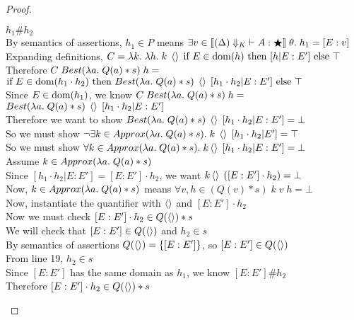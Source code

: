 \begin{proof}
\begin{tabbedproof}
            $h_1 \# h_2$ \\
    \oooooo By semantics of assertions, $h_1 \in P$ means 
            $\exists v \in \interp{\judgeWK[\restrictkind{\Delta}]{A}{\bigstar}}\;\theta.\;
               h_1 = [E:v]$ \\
    \oooooo Expanding definitions, 
             $C = \semfun{k}{\semfun{h}{k\;\unit\;\mbox{if } E\in\domain{h} \mbox{ then } [h|E:E'] \mbox{ else }\top}}$ \\
    \oooooo Therefore $C\;Best(\semfun{a}{Q(a) * s})\;h = $ \\
    \oooooox $\mbox{if }E\in\domain{h_1 \cdot h_2} \mbox{ then }Best(\semfun{a}{Q(a) * s})\;\unit\;[h_1 \cdot h_2|E:E'] \mbox{ else } \top$ \\
    \oooooo Since $E \in \domain{h_1}$, we know $C\;Best(\semfun{a}{Q(a) * s})\;h = $ \\
    \oooooox $Best(\semfun{a}{Q(a) * s})\;\unit\;[h_1 \cdot h_2|E:E']$ \\
    \oooooo Therefore we want to show $Best(\semfun{a}{Q(a) * s})\;\unit\;[h_1 \cdot h_2|E:E'] = \bot$ \\
    \oooooo So we must show $\lnot \exists k \in Approx(\semfun{a}{Q(a) * s}).\; k\;\unit\;[h_1 \cdot h_2|E'] = \top$ \\
    \oooooo So we must show $\forall k \in Approx(\semfun{a}{Q(a) * s}).\; k\unit\;[h_1\cdot h_2|E:E'] = \bot$ \\
    \oooooo Assume $k \in Approx(\semfun{a}{Q(a) * s})$ \\
    \ooooooo Since $[h_1\cdot h_2|E:E'] = [E:E']\cdot h_2$, we want 
             $k\unit\;([E:E']\cdot h_2) = \bot$ \\
    \ooooooo Now, $k \in Approx(\semfun{a}{Q(a) * s})$ means $\forall v, h \in (Q(v) * s)\; k\;v\;h = \bot$ \\
    \ooooooo Now, instantiate the quantifier with $\unit$ and $[E:E']\cdot h_2$ \\
    \ooooooo Now we must check $[E:E']\cdot h_2 \in Q(\unit) * s$ \\
    \ooooooo We will check that $[E:E'] \in Q(\unit)$ and $h_2 \in s$ \\
    \ooooooo By semantics of assertions $Q(\unit) = \setof{[E:E']}$, so $[E:E'] \in Q(\unit)$ \\
    \ooooooo From line 19, $h_2 \in s$ \\
    \ooooooo Since $[E:E']$ has the same domain as $h_1$, we know $[E:E'] \# h_2$ \\
    \ooooooo Therefore $[E:E']\cdot h_2 \in Q(\unit) * s$ \\

\end{tabbedproof}
\end{proof}
